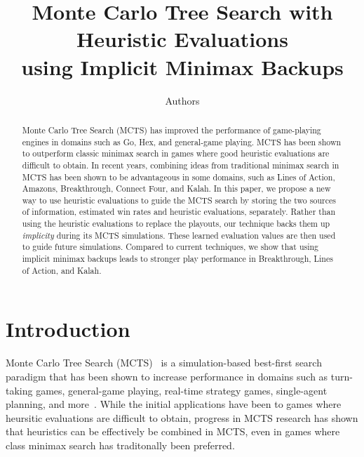 \documentclass[letterpaper]{article}
\begin{document}
%
\title{Monte Carlo Tree Search with Heuristic Evaluations\\using Implicit Minimax Backups}
\author{Authors}

\maketitle

\begin{abstract}
Monte Carlo Tree Search (MCTS) has improved the performance of game-playing engines in 
domains such as Go, Hex, and general-game playing. MCTS has been shown to outperform 
classic minimax search in games where good heuristic evaluations are difficult to obtain. 
In recent years, combining 
ideas from traditional minimax search in MCTS has been shown to be advantageous in some domains,
such as Lines of Action, Amazons, Breakthrough, Connect Four, and Kalah. In this paper, we propose 
a new way to use heuristic evaluations to guide the MCTS search by storing the two sources of 
information, estimated win rates and heuristic evaluations, separately. 
Rather than using the heuristic evaluations to replace the playouts, 
our technique backs them up {\it implicity} during its MCTS simulations. 
These learned evaluation values are then used to guide future simulations. 
Compared to current techniques, we show that using implicit minimax backups  
leads to stronger play performance in Breakthrough, Lines of Action, and Kalah. 
\end{abstract}


\section{Introduction}

Monte Carlo Tree Search (MCTS)~\cite{Coulom06Efficient,Kocsis06Bandit} is a simulation-based best-first
search paradigm that has been shown to increase performance in domains such as turn-taking games, 
general-game playing, real-time strategy games, single-agent planning, and more~\cite{mctssurvey}. 
While the initial applications have been to games where heursitic evaluations are difficult to obtain, 
progress in MCTS research has shown that heuristics can be effectively be combined in MCTS, even in games 
where class minimax search has traditonally been preferred. 
\end{document}
